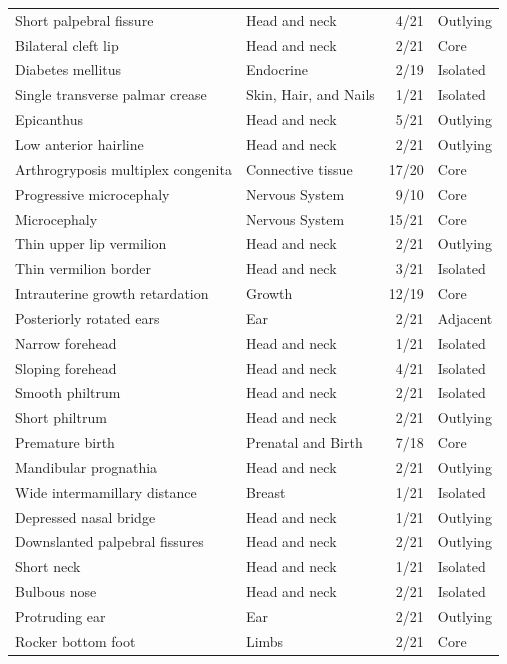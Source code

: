 \documentclass[
  authoryear,
  preprint,
  3p]{elsarticle}
\begin{document}
\begin{longtable}{llrl}
Short palpebral fissure & Head and neck & 4/21 & Outlying \\ 
Bilateral cleft lip & Head and neck & 2/21 & Core \\ 
Diabetes mellitus & Endocrine & 2/19 & Isolated \\ 
Single transverse palmar crease & Skin, Hair, and Nails & 1/21 & Isolated \\ 
Epicanthus & Head and neck & 5/21 & Outlying \\ 
Low anterior hairline & Head and neck & 2/21 & Outlying \\ 
Arthrogryposis multiplex congenita & Connective tissue & 17/20 & Core \\ 
Progressive microcephaly & Nervous System & 9/10 & Core \\ 
Microcephaly & Nervous System & 15/21 & Core \\ 
Thin upper lip vermilion & Head and neck & 2/21 & Outlying \\ 
Thin vermilion border & Head and neck & 3/21 & Isolated \\ 
Intrauterine growth retardation & Growth & 12/19 & Core \\ 
Posteriorly rotated ears & Ear & 2/21 & Adjacent \\ 
Narrow forehead & Head and neck & 1/21 & Isolated \\ 
Sloping forehead & Head and neck & 4/21 & Isolated \\ 
Smooth philtrum & Head and neck & 2/21 & Isolated \\ 
Short philtrum & Head and neck & 2/21 & Outlying \\ 
Premature birth & Prenatal and Birth & 7/18 & Core \\ 
Mandibular prognathia & Head and neck & 2/21 & Outlying \\ 
Wide intermamillary distance & Breast & 1/21 & Isolated \\ 
Depressed nasal bridge & Head and neck & 1/21 & Outlying \\ 
Downslanted palpebral fissures & Head and neck & 2/21 & Outlying \\ 
Short neck & Head and neck & 1/21 & Isolated \\ 
Bulbous nose & Head and neck & 2/21 & Isolated \\ 
Protruding ear & Ear & 2/21 & Outlying \\ 
Rocker bottom foot & Limbs & 2/21 & Core \\ 
\bottomrule
\end{longtable}
\end{document}
